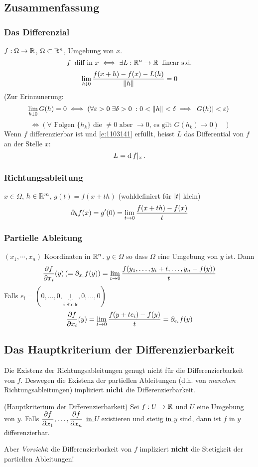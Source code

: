 \subsection{Zusammenfassung}
\subsubsection{Das Differenzial}
$f:\Omega\rightarrow\mathbb{R}$, $\Omega\subset\mathbb{R}^n$, Umgebung von $x$.
\[f\hspace{2mm}\text{diff in $x$}\iff \exists L:\mathbb{R}^n\rightarrow\mathbb{R}\hspace{2mm}\text{linear s.d.}\]
\begin{equation}
  \label{e:1103141}
  \lim_{h\downarrow 0}\frac{f(x+h)-f(x)-L(h)}{\left\| h \right\|}=0
\end{equation}
(Zur Erinnunerung:
\[\lim_{h\downarrow 0}G(h)=0\iff \left(\forall \varepsilon>0\; \exists \delta>0\;: 0<\left\| h \right\|<\delta\implies\left| G(h) \right|<\varepsilon\right)\, \]
\[\iff \left(\forall \text{ Folgen } \{h_k\} \mbox{ die $\neq 0$ aber $\to 0$, es gilt } G(h_k)\to 0\right)\quad \Big)\]
Wenn $f$ differenzierbar ist und \eqref{e:1103141} erfüllt, heisst $L$ das Differential von $f$ an
der Stelle $x$:
\[L=\operatorname{d} f|_x\, .\]
\subsubsection{Richtungsableitung}
$x\in\Omega$, $h\in\mathbb{R}^m$, $g(t)=f(x+th)$ (wohldefiniert für $\left| t \right|$ klein)
\[\partial_h f(x)=g'(0)=\displaystyle\lim_{t\rightarrow0}\frac{f(x+th)-f(x)}{t}\]
\subsubsection{Partielle Ableitung}
$(x_1,\cdots,x_n)$ Koordinaten in $\mathbb{R}^n$. $y\in \Omega$ so dass $\Omega$ eine Umgebung von $y$ ist.
Dann
\[\dfrac{\partial f}{\partial x_i}(y)\left( =\partial_{x_i}f(y) \right)=\displaystyle\lim_{t\rightarrow0}\frac{f (y_1,\dots,y_i+t,\dots,y_n-f(y))}{t}\]
Falls $e_i=(0,\dots,0,\underbrace{1}_{i\text{ Stelle}},0,\dots,0)$
\[\dfrac{\partial f}{\partial x_i}(y)=\displaystyle\lim_{t\rightarrow0}\frac{f(y+te_i)-f(y)}{t}=\partial_{e_i}f(y)\]

\subsection{Das Hauptkriterium der Differenzierbarkeit}

Die Existenz der Richtungsableitungen genugt nicht f\"ur die Differenzierbarkeit von $f$.
Deswegen die Existenz der partiellen Ableitungen (d.h. von {\em manchen} Richtungsableitungen)
impliziert {\bf nicht} die Differenzierbarkeit.

\begin{Sat}
  (Hauptkriterium der Differenzierbarkeit) Sei $f:U\rightarrow \mathbb{R}$ und $U$ eine Umgebung von $y$. Falls $\dfrac{\partial f}{\partial x_1},\dots,\dfrac{\partial f}{\partial x_n}$ \ul{in $U$} existieren und stetig \ul{in $y$} sind, dann ist $f$ in $y$ differenzierbar.
\end{Sat}
\begin{Bem}
Aber {\em Vorsicht}: die Differenzierbarkeit von $f$ impliziert {\bf nicht} die Stetigkeit der 
partiellen Ableitungen!
\end{Bem}

